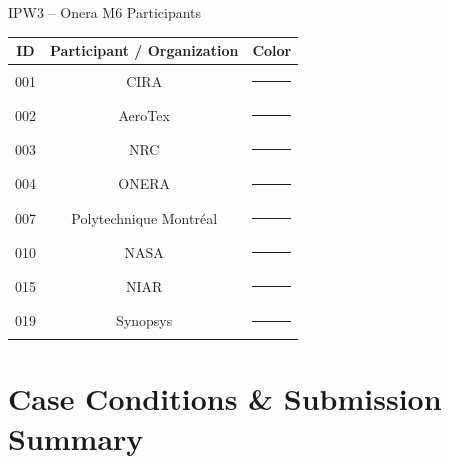 
\begin{frame}{\small IPW3 -- Onera M6 Participants}
\scriptsize


\centering

\renewcommand{\arraystretch}{1.20}
\setlength{\tabcolsep}{8pt}

\begin{tabular}{ccc}
\toprule
\textbf{ID} &
\textbf{Participant / Organization} &
\textbf{Color} \\
\midrule

001 & CIRA                   & \textcolor{p001}{\rule{1.5cm}{1.5pt}} \\
002 & AeroTex                & \textcolor{p002}{\rule{1.5cm}{1.5pt}} \\
003 & NRC                    & \textcolor{p003}{\rule{1.5cm}{1.5pt}} \\
004 & ONERA                  & \textcolor{p004}{\rule{1.5cm}{1.5pt}} \\
007 & Polytechnique Montréal & \textcolor{p007}{\rule{1.5cm}{1.5pt}} \\
010 & NASA                   & \textcolor{p010}{\rule{1.5cm}{1.5pt}} \\
015 & NIAR                   & \textcolor{p015}{\rule{1.5cm}{1.5pt}} \\
019 & Synopsys               & \textcolor{p019}{\rule{1.5cm}{1.5pt}} \\

\bottomrule
\end{tabular}

\end{frame}

\section[Case \& Submissions]{\textbf{Case Conditions \& Submission Summary}}

